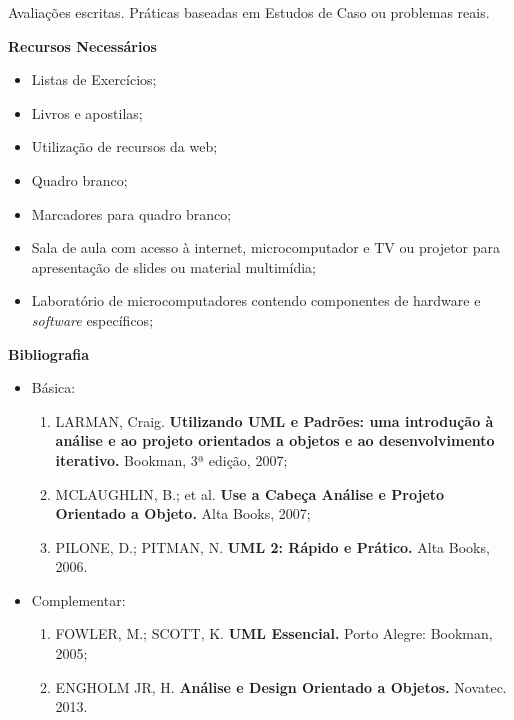 \noindent
  Avaliações escritas. Práticas baseadas em Estudos de Caso ou problemas reais.


\begin{snugshade}\begin{center}\textbf{
    Recursos Necessários
    \vphantom{q} %
}\end{center}\end{snugshade}

\begin{itemize} 
  	\item Listas de Exercícios;
  	  \item Livros e apostilas;
  	  \item Utilização de recursos da web;
  	  \item Quadro branco;
  	  \item Marcadores para quadro branco;
  	  \item Sala de aula com acesso à internet, microcomputador e TV ou projetor para apresentação de slides ou material multimídia;
  	  \item Laboratório de microcomputadores contendo componentes de hardware e \textit{software} específicos;
\end{itemize}



\begin{snugshade}\begin{center}\textbf{
    Bibliografia
}\end{center}\end{snugshade}

\begin{itemize} 
  \item Básica:
	\begin{enumerate}
  	\item LARMAN, Craig. \textbf{Utilizando UML e Padrões: uma introdução à análise e ao projeto orientados a objetos e ao desenvolvimento iterativo.} Bookman,  3ª edição, 2007;
	\item MCLAUGHLIN, B.; et al. \textbf{Use a Cabeça Análise e Projeto Orientado a Objeto.} Alta Books, 2007;
	\item PILONE, D.; PITMAN, N. \textbf{UML 2: Rápido e Prático.} Alta Books, 2006.    	\end{enumerate}
  \item Complementar:
	\begin{enumerate} 
  	\item FOWLER, M.; SCOTT, K. \textbf{UML Essencial.} Porto Alegre: Bookman, 2005;
	\item ENGHOLM JR, H. \textbf{Análise e Design Orientado a Objetos.} Novatec. 2013.
	\end{enumerate}
\end{itemize}
